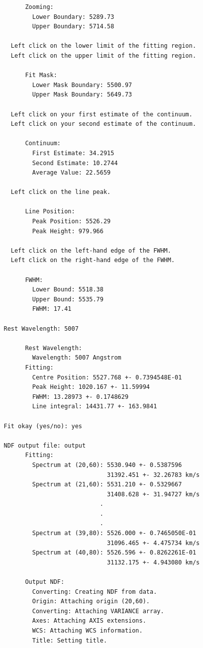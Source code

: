 \documentclass[twoside,11pt]{article}
\begin{document}
{\begin{verbatim}
         Zooming:
           Lower Boundary: 5289.73
           Upper Boundary: 5714.58
 
     Left click on the lower limit of the fitting region.
     Left click on the upper limit of the fitting region.
 
         Fit Mask:
           Lower Mask Boundary: 5500.97
           Upper Mask Boundary: 5649.73
 
     Left click on your first estimate of the continuum.
     Left click on your second estimate of the continuum.
 
         Continuum:
           First Estimate: 34.2915
           Second Estimate: 10.2744
           Average Value: 22.5659
 
     Left click on the line peak.
  
         Line Position:
           Peak Position: 5526.29
           Peak Height: 979.966
 
     Left click on the left-hand edge of the FWHM.
     Left click on the right-hand edge of the FWHM.
 
         FWHM:
           Lower Bound: 5518.38
           Upper Bound: 5535.79
           FWHM: 17.41
 
   Rest Wavelength: 5007
 
         Rest Wavelength:
           Wavelength: 5007 Angstrom
         Fitting:
           Centre Position: 5527.768 +- 0.7394548E-01
           Peak Height: 1020.167 +- 11.59994
           FWHM: 13.28973 +- 0.1748629
           Line integral: 14431.77 +- 163.9841
 
   Fit okay (yes/no): yes
 
   NDF output file: output
         Fitting:
           Spectrum at (20,60): 5530.940 +- 0.5387596
                                31392.451 +- 32.26783 km/s
           Spectrum at (21,60): 5531.210 +- 0.5329667
                                31408.628 +- 31.94727 km/s
                              .
                              .
                              .
           Spectrum at (39,80): 5526.000 +- 0.7465050E-01
                                31096.465 +- 4.475734 km/s
           Spectrum at (40,80): 5526.596 +- 0.8262261E-01
                                31132.175 +- 4.943080 km/s
 
         Output NDF:
           Converting: Creating NDF from data.
           Origin: Attaching origin (20,60).
           Converting: Attaching VARIANCE array.
           Axes: Attaching AXIS extensions.
           WCS: Attaching WCS information.
           Title: Setting title.


\end{verbatim}}
\end{document}
